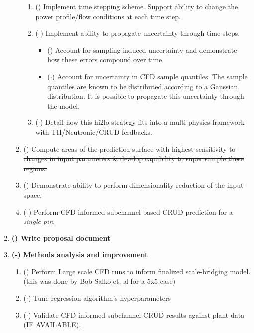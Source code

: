 \begin{enumerate}
\begin{enumerate}
        \begin{enumerate}
            \item (\checkmark) Implement time stepping scheme.  Support ability to change the power profile/flow conditions at each time step.
            \item (\checkmark-) Implement ability to propagate uncertainty through time steps.
            \begin{itemize}
                \item (\checkmark) Account for sampling-induced uncertainty and demonstrate how these errors compound over time.
                \item ($\cdot$) {\color{blue} Account for uncertainty in CFD sample quantiles. The sample quantiles are known
                                    to be distributed according to a Gaussian distribution.  It is possible to propagate
                                    this uncertainty through the model.}
            \end{itemize}
        \item ($\cdot$) {\color{blue} Detail how this hi2lo strategy fits into a multi-physics framework with TH/Neutronic/CRUD feedbacks.}
        \end{enumerate}
        \item (\xmark) \sout{Compute areas of the prediction surface with highest
                             sensitivity to changes in input parameters \& develop capability to super sample these regions.}
        \item (\xmark) \sout{Demonstrate ability to perform dimensionality reduction of the input space.}
        \item (\checkmark-) Perform CFD informed subchannel based CRUD prediction for a \emph{single pin}.
    \end{enumerate}
\item \textbf{(\checkmark) Write proposal document}
\item \textbf{(\checkmark-) Methods analysis and improvement}
    \begin{enumerate}
        \item (\checkmark) Perform Large scale CFD runs to inform finalized scale-bridging model.  (this was done by Bob Salko et. al for a 5x5 case)
        \item ($\cdot$) Tune regression algorithm's hyperparameters
        \item ($\cdot$) Validate CFD informed subchannel CRUD results against plant data (IF AVAILABLE).

\end{enumerate}
\end{enumerate}
